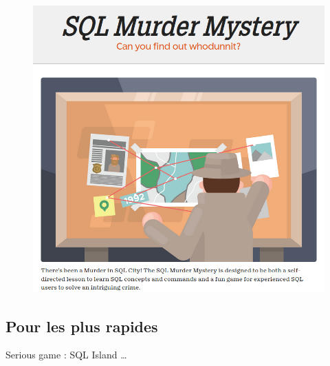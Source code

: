 \documentclass[
  letterpaper,
  DIV=11,
  numbers=noendperiod]{scrartcl}
\begin{document}
\begin{figure}

{\centering 

\href{https://mystery.knightlab.com/}{\includegraphics{sql_city.png}}

}

\end{figure}

\hypertarget{fa-desktop-pour-les-plus-rapides}{%
\subsection{\texorpdfstring{ Pour les plus
rapides}{ Pour les plus rapides}}\label{fa-desktop-pour-les-plus-rapides}}

Serious game : SQL Island \ldots{}
\end{document}
